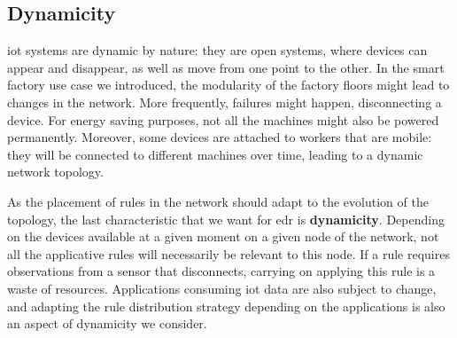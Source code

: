 \documentclass[sw]{iosart2x}
\begin{document}
\subsection{Dynamicity}

\gls{iot} systems are dynamic by nature: they are open systems, where devices can appear and disappear, as well as move from one point to the other. 
In the smart factory use case we introduced, the modularity of the factory floors might lead to changes in the network.
More frequently, failures might happen, disconnecting a device. 
For energy saving purposes, not all the machines might also be powered permanently.
Moreover, some devices are attached to workers that are mobile: they will be connected to different machines over time, leading to a dynamic network topology.

As the placement of rules in the network should adapt to the evolution of the topology, the last characteristic that we want for \gls{edr} is \textbf{dynamicity}.
Depending on the devices available at a given moment on a given node of the network, not all the applicative rules will necessarily be relevant to this node.
If a rule requires observations from a sensor that disconnects, carrying on applying this rule is a waste of resources. 
Applications consuming \gls{iot} data are also subject to change, and adapting the rule distribution strategy depending on the applications is also an aspect of dynamicity we consider.

\end{document}
